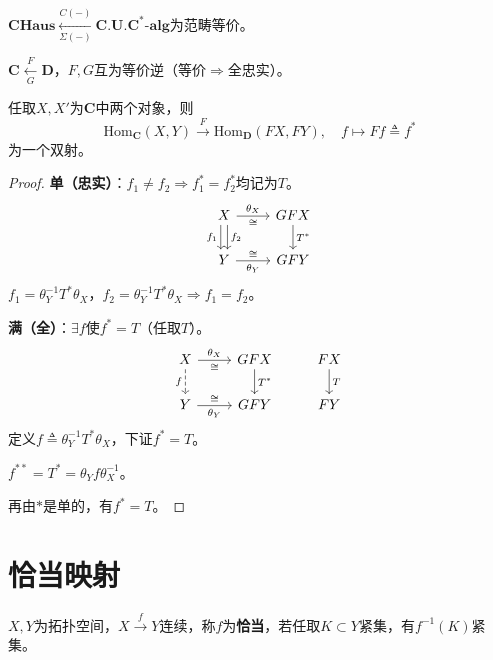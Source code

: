 \documentclass[lang=cn,a4paper,newtx,section]{elegantbook}
\begin{document}
\begin{theorem}
  $\mathbf{CHaus} \xleftarrow[\Sigma(-)]{C(-)} \mathbf{C.U.C^*\text{-}alg}$为范畴等价。
\end{theorem}

\begin{proposition}
  $\mathbf{C} \xleftarrow[G]{F} \mathbf{D}$，$F, G$互为等价逆（等价$\Rightarrow$全忠实）。
  
  任取$X, X'$为$\mathbf{C}$中两个对象，则
  \begin{equation*}
    \mathrm{Hom}_{\mathbf{C}}(X, Y) \xrightarrow{F} \mathrm{Hom}_{\mathbf{D}}(FX, FY), \quad f \mapsto Ff \triangleq f^*
  \end{equation*}
  为一个双射。
\end{proposition}

\begin{proof}
  \textbf{单（忠实）}：$f_1 \neq f_2 \Rightarrow f_1^* = f_2^*$均记为$T$。
  \begin{equation*}
    \begin{tikzcd}
      X \arrow[r, "\theta_X", "\cong"'] \arrow[d, "f_1"', shift right] \arrow[d, "f_2", shift left] & GFX \arrow[d, "T^*"] \\
      Y \arrow[r, "\theta_Y"', "\cong"] & GFY
    \end{tikzcd}
  \end{equation*}
  $f_1 = \theta_Y^{-1}T^*\theta_X$，$f_2 = \theta_Y^{-1}T^*\theta_X \Rightarrow f_1 = f_2$。
  
  \textbf{满（全）}：$\exists f$使$f^* = T$（任取$T$）。
  \begin{equation*}
    \begin{tikzcd}
      X \arrow[r, "\theta_X", "\cong"'] \arrow[d, "f"', dashed] & GFX \arrow[d, "T^*"] & FX \arrow[d, "T"] \\
      Y \arrow[r, "\theta_Y"', "\cong"] & GFY & FY
    \end{tikzcd}
  \end{equation*}
  定义$f \triangleq \theta_Y^{-1}T^*\theta_X$，下证$f^* = T$。
  
  $f^{**} = T^* = \theta_Y f \theta_X^{-1}$。
  
  再由$*$是单的，有$f^* = T$。
\end{proof}

\section{恰当映射}

\begin{definition}[恰当映射]
  $X, Y$为拓扑空间，$X \xrightarrow{f} Y$连续，称$f$为\textbf{恰当}，若任取$K \subset Y$紧集，有$f^{-1}(K)$紧集。
\end{definition}
\end{document}
